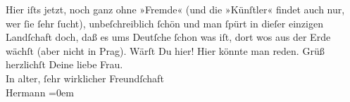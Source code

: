 \begin{ledgroupsized}[t]{13cm}
           Hier iſts jetzt, noch ganz ohne »Fremde« (und die »Künſtler« findet auch nur, wer ſie
               ſehr ſucht), unbeſchreiblich ſchön und man ſpürt in dieſer einzigen Landſchaft doch,
               daß es ums Deutſche ſchon was iſt, dort wos aus der Erde wächſt (aber nicht in Prag).\pend
           \pstart
           Wärſt Du hier!\pend
           \pstart
           Hier könnte man reden.\pend
           \pstart
           Grüß herzlichſt Deine liebe Frau.{\\[\baselineskip]}In alter, ſehr wirklicher Freundſchaft{\\[\baselineskip]}\spacefill\mbox{Hermann}\pend
           \leftskip=0em{}\endnumbering{}\end{ledgroupsized}  \newcommand{\dateiname}{L01851}\newcommand{\titel}{Hermann Bahr an Arthur Schnitzler, 28. 6. 1909}\newcommand{\editorInnen}{ Kurt Ifkovits,  Martin Anton Müller}
      